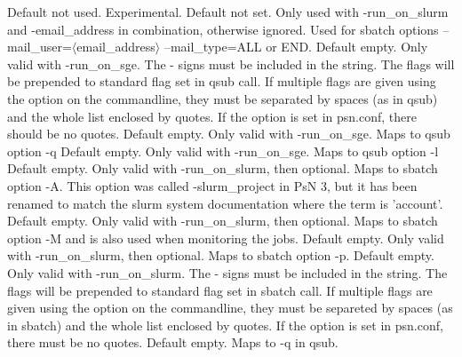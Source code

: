\begin{optionlist}
\nextopt
{}
Default not used. Experimental.
\nextopt
{}
Default not set. Only used with -run\_on\_slurm and -email\_address in combination, otherwise ignored. Used for sbatch options --mail\_user=$\langle$email\_address$\rangle$ --mail\_type=ALL or END.  
\nextopt
{}
Default empty. Only valid with -run\_on\_sge. The - signs must be included in the string. The flags will be prepended to standard flag set in qsub call. If multiple flags are given using the option on the commandline, they must be separated by spaces (as in qsub) and the whole list enclosed by quotes. If the option is set in psn.conf, there should be no quotes. 
\nextopt
{}
Default empty. Only valid with -run\_on\_sge. Maps to qsub option -q 
\nextopt
{}
Default empty. Only valid with -run\_on\_sge. Maps to qsub option -l 
\nextopt
{}
Default empty. Only valid with -run\_on\_slurm, then optional. Maps to sbatch option -A. This option was called -slurm\_project in PsN 3, but it has been renamed to match the slurm system documentation where the term is 'account'.
\nextopt
{}
Default empty. Only valid with -run\_on\_slurm, then optional. Maps to sbatch option -M and is also used when monitoring the jobs.
\nextopt
{}
Default empty. Only valid with -run\_on\_slurm, then optional. Maps to sbatch option -p.
\nextopt
{}
Default empty. Only valid with -run\_on\_slurm. The - signs must be included in the string. The flags will be prepended to standard flag set in sbatch call. If multiple flags are given using the option on the commandline, they must be separeted by spaces (as in sbatch) and the whole list enclosed by quotes. If the option is set in psn.conf, 
there must be no quotes. 
\nextopt
{}
Default empty. Maps to -q in qsub. 
\nextopt
\end{optionlist}
